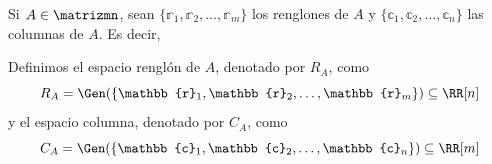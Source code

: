 \begin{definicion}{}{}
    Si $A \in \matrizmn$, sean $\{ \mathbb{r}_1, \mathbb{r}_2, \dots, \mathbb{r}_m \}$ los renglones de $A$ y $\{ \mathbb{c}_1, \mathbb{c}_2, \dots, \mathbb{c}_n \}$ las columnas de $A$. Es decir,
    \begin{matrizn}
    \end{matrizn}
    Definimos el espacio renglón de $A$, denotado por $R_A$, como
    $$R_A = \Gen (\{ \mathbb{r}_1, \mathbb{r}_2, \dots, \mathbb{r}_m \}) \subseteq \RR[n]$$
    y el espacio columna, denotado por $C_A$, como
    $$C_A = \Gen (\{ \mathbb{c}_1, \mathbb{c}_2, \dots, \mathbb{c}_n \}) \subseteq \RR[m]$$
\end{definicion}

